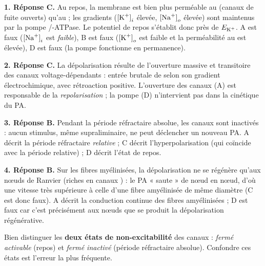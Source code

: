 \documentclass[11pt]{article}
\begin{document}
\begin{corrige}
\textbf{1. Réponse C.} Au repos, la membrane est bien plus perméable au  (canaux de fuite  ouverts) qu'au  ; les gradients (${[\ce{K+}]}_{i}$ élevée, ${[\ce{Na+}]}_{o}$ élevée) sont maintenus par la pompe /-ATPase. Le potentiel de repos s'établit donc près de $E_{\ce{K+}}$. A est faux (${[\ce{Na+}]}_{i}$ est \emph{faible}), B est faux (${[\ce{K+}]}_{o}$ est faible et la perméabilité au  est élevée), D est faux (la pompe fonctionne en permanence).

\textbf{2. Réponse C.} La dépolarisation résulte de l'ouverture massive et transitoire des canaux  voltage-dépendants : entrée brutale de  selon son gradient électrochimique, avec rétroaction positive. L'ouverture des canaux  (A) est responsable de la \emph{repolarisation} ; la pompe (D) n'intervient pas dans la cinétique du PA.

\textbf{3. Réponse B.} Pendant la période réfractaire absolue, les canaux  sont inactivés : aucun stimulus, même supraliminaire, ne peut déclencher un nouveau PA. A décrit la période réfractaire \emph{relative} ; C décrit l'hyperpolarisation (qui coïncide avec la période relative) ; D décrit l'état de repos.

\textbf{4. Réponse B.} Sur les fibres myélinisées, la dépolarisation ne se régénère qu'aux nœuds de Ranvier (riches en canaux ) : le PA « saute » de nœud en nœud, d'où une vitesse très supérieure à celle d'une fibre amyélinisée de même diamètre (C est donc faux). A décrit la conduction continue des fibres amyélinisées ; D est faux car c'est précisément aux nœuds que se produit la dépolarisation régénérative.

\begin{attention}
Bien distinguer les \textbf{deux états de non-excitabilité} des canaux  : \emph{fermé activable} (repos) et \emph{fermé inactivé} (période réfractaire absolue). Confondre ces états est l'erreur la plus fréquente.
\end{attention}
\end{corrige}
\end{document}
